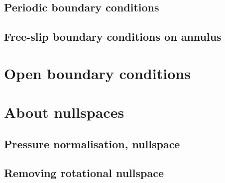 \subsection{Periodic boundary conditions\label{ss_periodic}} %
\newpage %
\subsection{Free-slip boundary conditions on annulus}\label{ss:fsbc_annulus} %

\newpage %
\section{Open boundary conditions}\label{ss:openbc} %

\newpage %
\section{About nullspaces} 
\subsection{Pressure normalisation, nullspace\label{ss_pnorm}}  %
\subsection{Removing rotational nullspace\label{ss_nullspace}}  %

